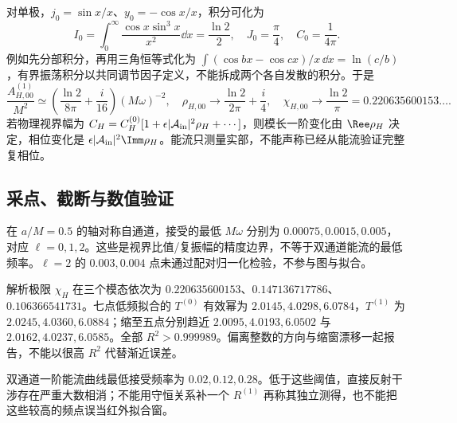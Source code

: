 对单极，$j_0=\sin x/x$、$y_0=-\cos x/x$，积分可化为
\begin{equation}
 I_0=\int_0^\infty\frac{\cos x\sin^3x}{x^2}\dd x
       =\frac{\ln2}{2},\quad J_0=\frac\pi4,\quad C_0=\frac1{4\pi}.
\end{equation}
例如先分部积分，再用三角恒等式化为 $\int(\cos bx-\cos cx)/x\,\dd x=\ln(c/b)$，有界振荡积分以共同调节因子定义，不能拆成两个各自发散的积分。于是
\begin{equation}
 \frac{A_{H,00}^{(1)}}{M^2}\simeq
 \left(\frac{\ln2}{8\pi}+\frac i{16}\right)(M\omega)^{-2},\quad
 \rho_{H,00}\to\frac{\ln2}{2\pi}+\frac i4,\quad
 \boxed{\chi_{H,00}\to\frac{\ln2}{\pi}=0.220635600153\ldots.}
\end{equation}
若物理视界幅为 $C_H=C_H^{(0)}[1+\epsilon|\mathcal A_{\rm in}|^2\rho_H+\cdots]$，则模长一阶变化由 $\Ree\rho_H$ 决定，相位变化是 $\epsilon|\mathcal A_{\rm in}|^2\Imm\rho_H$。能流只测量实部，不能声称已经从能流验证完整复相位。

\subsection{采点、截断与数值验证}
在 $a/M=0.5$ 的轴对称自通道，接受的最低 $M\omega$ 分别为
$0.00075,0.0015,0.005$，对应 $\ell=0,1,2$。这些是视界比值/复振幅的精度边界，不等于双通道能流的最低频率。$\ell=2$ 的 $0.003,0.004$ 点未通过配对归一化检验，不参与图与拟合。

解析极限 $\chi_H$ 在三个模态依次为 $0.220635600153$、$0.147136717786$、$0.106366541731$。七点低频拟合的 $T^{(0)}$ 有效幂为 $2.0145,4.0298,6.0784$，$T^{(1)}$ 为 $2.0245,4.0360,6.0884$；缩至五点分别趋近 $2.0095,4.0193,6.0502$ 与 $2.0162,4.0237,6.0585$。全部 $R^2>0.999989$。偏离整数的方向与缩窗漂移一起报告，不能以很高 $R^2$ 代替渐近误差。

双通道一阶能流曲线最低接受频率为 $0.02,0.12,0.28$。低于这些阈值，直接反射干涉存在严重大数相消；不能用守恒关系补一个 $R^{(1)}$ 再称其独立测得，也不能把这些较高的频点误当红外拟合窗。

